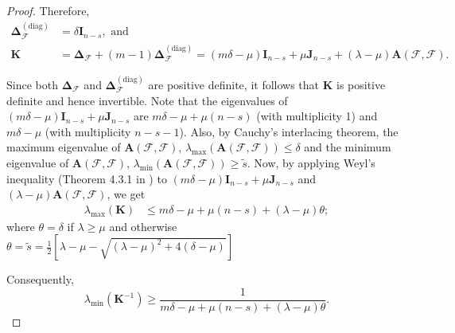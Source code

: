 \documentclass[journal,draftcls,onecolumn]{IEEEtran}
\theoremstyle{mystyle}
\newcommand{\bfA}{\mathbf{A}}
\newcommand{\bfI}{\mathbf{I}}
\newcommand{\cF}{\mathcal{F}}
\newcommand{\aditya}[1]{\marginpar{+}{\bf Aditya's remark}: {\em #1}}
\newcommand{\sifat}[1]{\marginpar{+}{\bf Sifat's remark}: {\em #1}}
\begin{document}
\begin{proof}
Therefore, %
\begin{align*}
\mathbf{\Delta}^{(\text{diag})}_{\mathcal{F}} & = \delta \mathbf{I}_{n-s}, \text{~and}\\
\mathbf{K}& = \mathbf{\Delta}_{\mathcal{F}} + (m-1) \mathbf{\Delta}^{(\text{diag})}_{\mathcal{F}} = (m\delta-\mu) \bfI_{n-s} + \mu \mathbf{J} _{n-s} + (\lambda - \mu) \bfA(\mathcal{F},\mathcal{F}).
\end{align*}


Since both $\mathbf{\Delta}_{\mathcal{F}}$ and $\mathbf{\Delta}^{(\text{diag})}_{\mathcal{F}}$ are positive definite, it follows that $\mathbf{K}$ is positive definite and hence invertible. 
Note that the eigenvalues of $(m\delta-\mu) \bfI_{n-s} + \mu \mathbf{J} _{n-s}$ are $m\delta-\mu + \mu (n-s)$ (with multiplicity 1) and $m\delta-\mu$ (with multiplicity $n-s-1$). Also, by Cauchy's interlacing theorem, the maximum eigenvalue of $\mathbf{A}(\mathcal{F}, \mathcal{F})$, $\lambda_{\text{max}}(\mathbf{A}(\mathcal{F}, \mathcal{F})) \le \delta$ and the minimum eigenvalue of $\mathbf{A}(\mathcal{F}, \mathcal{F})$, $\lambda_{\text{min}}(\mathbf{A}(\mathcal{F}, \mathcal{F})) \ge \tilde{s}$. Now, by applying Weyl's inequality (Theorem 4.3.1 in \cite{horn2012matrix}) to $(m\delta-\mu) \bfI_{n-s} + \mu \mathbf{J} _{n-s}$ and $(\lambda - \mu) \bfA(\mathcal{F},\mathcal{F})$, we get
\begin{align*}
    \lambda_{\max} (\mathbf{K}) &\leq m\delta-\mu + \mu (n-s) + (\lambda - \mu) \theta \label{eq:upper_bd_lmax};
\end{align*}
where $\theta = \delta$ if $\lambda \ge \mu$ and otherwise $\theta = \tilde{s} = \frac{1}{2}[ \lambda - \mu - \sqrt{(\lambda - \mu)^2 + 4(\delta - \mu)}]$

Consequently, 
\[\lambda_{\text{min}}(\mathbf{K}^{-1}) \ge \frac{1}{ m\delta-\mu + \mu (n-s) + (\lambda - \mu) \theta}. \]


\end{proof}
\end{document}
